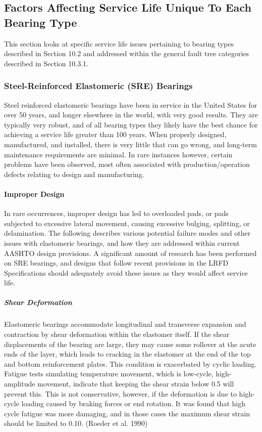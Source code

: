 \subsection{Factors Affecting Service Life Unique To Each Bearing Type}
This section looks at specific service life issues pertaining to bearing types described in Section 10.2 and addressed within the general fault tree categories described in Section 10.3.1.
\subsubsection{Steel-Reinforced Elastomeric (SRE) Bearings}
Steel reinforced elastomeric bearings have been in service in the United States for over 50 years, and longer elsewhere in the world, with very good results. They are typically very robust, and of all bearing types they likely have the best chance for achieving a service life greater than 100 years. When properly designed, manufactured, and installed, there is very little that can go wrong, and long-term maintenance requirements are minimal. In rare instances however, certain problems have been observed, most often associated with production/operation defects relating to design and manufacturing.

\paragraph{Improper Design}
In rare occurrences, improper design has led to overloaded pads, or pads subjected to excessive lateral movement, causing excessive bulging, splitting, or delamination. The following describes various potential failure modes and other issues with elastomeric bearings, and how they are addressed within current AASHTO design provisions. A significant amount of research has been performed on SRE bearings, and designs that follow recent provisions in the LRFD Specifications should adequately avoid these issues as they would affect service life.


\subparagraph{Shear Deformation}
Elastomeric bearings accommodate longitudinal and transverse expansion and contraction by shear deformation
within the elastomer itself. If the shear displacements of the bearing are large, they may cause some rollover at the
acute ends of the layer, which leads to cracking in the elastomer at the end of the top and bottom reinforcement
plates. This condition is exacerbated by cyclic loading. Fatigue tests simulating temperature movement, which is
low-cycle, high-amplitude movement, indicate that keeping the shear strain below 0.5 will prevent this. This is not
conservative, however, if the deformation is due to high-cycle loading caused by braking forces or end rotation. It
was found that high cycle fatigue was more damaging, and in those cases the maximum shear strain should be limited
to 0.10. (Roeder et al. 1990)

